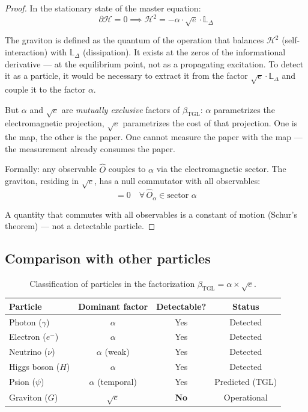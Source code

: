\documentclass[12pt,a4paper,twoside]{article}
\newcommand{\betatgl}{\beta_{\!\scriptscriptstyle\mathrm{TGL}}}
\newcommand{\psion}{\psi}
\begin{document}
\begin{proof}
In the stationary state of the master equation:
\begin{equation}
\partial\mathcal{H} = 0 \implies \mathcal{H}^2 = -\alpha \cdot \sqrt{e} \cdot \mathbb{L}_\Delta
\end{equation}

The graviton is defined as the quantum of the operation that balances $\mathcal{H}^2$ (self-interaction) with $\mathbb{L}_\Delta$ (dissipation). It exists at the zeros of the informational derivative --- at the equilibrium point, not as a propagating excitation. To detect it as a particle, it would be necessary to extract it from the factor $\sqrt{e} \cdot \mathbb{L}_\Delta$ and couple it to the factor $\alpha$.

But $\alpha$ and $\sqrt{e}$ are \textit{mutually exclusive} factors of $\betatgl$: $\alpha$ parametrizes the electromagnetic projection, $\sqrt{e}$ parametrizes the cost of that projection. One is the map, the other is the paper. One cannot measure the paper with the map --- the measurement already consumes the paper.

Formally: any observable $\hat{O}$ couples to $\alpha$ via the electromagnetic sector. The graviton, residing in $\sqrt{e}$, has a null commutator with all observables:
\begin{equation}
[\hat{G}_{\text{graviton}}, \hat{O}_\alpha] = 0 \quad \forall\, \hat{O}_\alpha \in \text{sector } \alpha
\end{equation}

A quantity that commutes with all observables is a constant of motion (Schur's theorem) --- not a detectable particle.
\end{proof}

\subsection{Comparison with other particles}

\begin{table}[H]
\centering
\caption{Classification of particles in the factorization $\betatgl = \alpha \times \sqrt{e}$.}
\label{tab:particulas}
\begin{tabular}{lccc}
\toprule
\textbf{Particle} & \textbf{Dominant factor} & \textbf{Detectable?} & \textbf{Status} \\
\midrule
Photon ($\gamma$) & $\alpha$ & Yes & Detected \\
Electron ($e^-$) & $\alpha$ & Yes & Detected \\
Neutrino ($\nu$) & $\alpha$ (weak) & Yes & Detected \\
Higgs boson ($H$) & $\alpha$ & Yes & Detected \\
Psion ($\psion$) & $\alpha$ (temporal) & Yes & Predicted (TGL) \\
\midrule
Graviton ($G$) & $\sqrt{e}$ & \textbf{No} & Operational \\
\bottomrule
\end{tabular}
\end{table}
\end{document}
